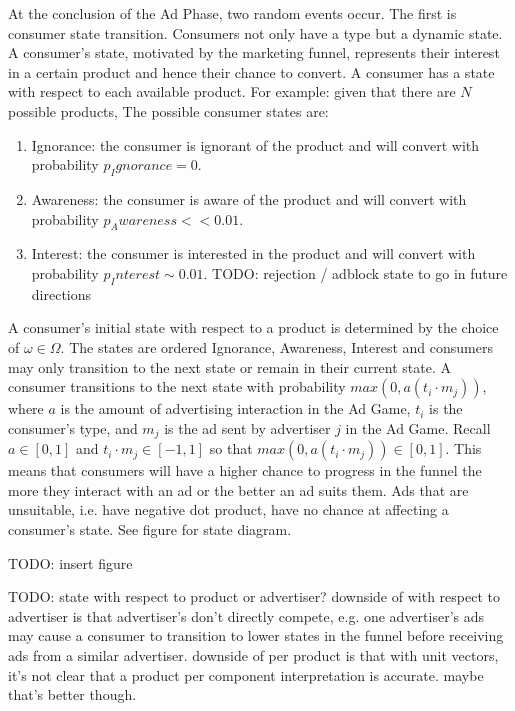 \documentclass{article}
\begin{document}
At the conclusion of the Ad Phase, two random events occur. The first is consumer state transition. Consumers not only have a type but a dynamic state. A consumer's state, motivated by the marketing funnel, represents their interest in a certain product and hence their chance to convert. A consumer has a state with respect to each available product. For example: given that there are $N$ possible products,  The possible consumer states are:

\begin{enumerate}
	\item Ignorance: the consumer is ignorant of the product and will convert with probability $p_Ignorance = 0$.
	\item Awareness: the consumer is aware of the product and will convert with probability $p_Awareness << 0.01$.
	\item Interest: the consumer is interested in the product and will convert with probability $p_Interest \sim 0.01$.
TODO: rejection / adblock state to go in future directions
\end{enumerate}

A consumer's initial state with respect to a product is determined by the choice of $\omega \in \Omega$. The states are ordered Ignorance, Awareness, Interest and consumers may only transition to the next state or remain in their current state. A consumer transitions to the next state with probability $max(0, a (t_i \cdot m_j))$, where $a$ is the amount of advertising interaction in the Ad Game, $t_i$ is the consumer's type, and $m_j$ is the ad sent by advertiser $j$ in the Ad Game. Recall $a \in [0,1]$ and $t_i \cdot m_j \in [-1,1]$ so that $max(0, a (t_i \cdot m_j)) \in [0,1]$. This means that consumers will have a higher chance to progress in the funnel the more they interact with an ad or the better an ad suits them. Ads that are unsuitable, i.e. have negative dot product, have no chance at affecting a consumer's state. See figure for state diagram.

TODO: insert figure

TODO: state with respect to product or advertiser? downside of with respect to advertiser is that advertiser's don't directly compete, e.g. one advertiser's ads may cause a consumer to transition to lower states in the funnel before receiving ads from a similar advertiser. downside of per product is that with unit vectors, it's not clear that a product per component interpretation is accurate. maybe that's better though.
\end{document}
